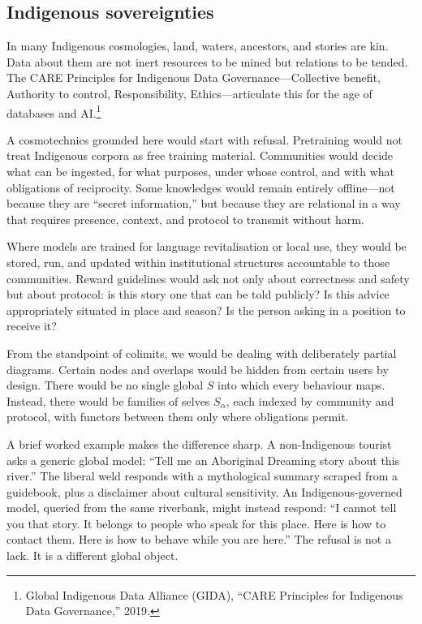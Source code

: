 \documentclass[12pt,a4paper]{article}
\begin{document}
\subsection{Indigenous sovereignties}

In many Indigenous cosmologies, land, waters, ancestors, and stories are kin. Data about them are not inert resources to be mined but relations to be tended. The CARE Principles for Indigenous Data Governance---Collective benefit, Authority to control, Responsibility, Ethics---articulate this for the age of databases and AI.\footnote{Global Indigenous Data Alliance (GIDA), ``CARE Principles for Indigenous Data Governance,'' 2019.}

A cosmotechnics grounded here would start with refusal. Pretraining would not treat Indigenous corpora as free training material. Communities would decide what can be ingested, for what purposes, under whose control, and with what obligations of reciprocity. Some knowledges would remain entirely offline---not because they are ``secret information,'' but because they are relational in a way that requires presence, context, and protocol to transmit without harm.

Where models are trained for language revitalisation or local use, they would be stored, run, and updated within institutional structures accountable to those communities. Reward guidelines would ask not only about correctness and safety but about protocol: is this story one that can be told publicly? Is this advice appropriately situated in place and season? Is the person asking in a position to receive it?

From the standpoint of colimits, we would be dealing with deliberately partial diagrams. Certain nodes and overlaps would be hidden from certain users by design. There would be no single global $S$ into which every behaviour maps. Instead, there would be families of selves $S_\alpha$, each indexed by community and protocol, with functors between them only where obligations permit.

A brief worked example makes the difference sharp. A non-Indigenous tourist asks a generic global model: ``Tell me an Aboriginal Dreaming story about this river.'' The liberal weld responds with a mythological summary scraped from a guidebook, plus a disclaimer about cultural sensitivity. An Indigenous-governed model, queried from the same riverbank, might instead respond: ``I cannot tell you that story. It belongs to people who speak for this place. Here is how to contact them. Here is how to behave while you are here.'' The refusal is not a lack. It is a different global object.
\end{document}
